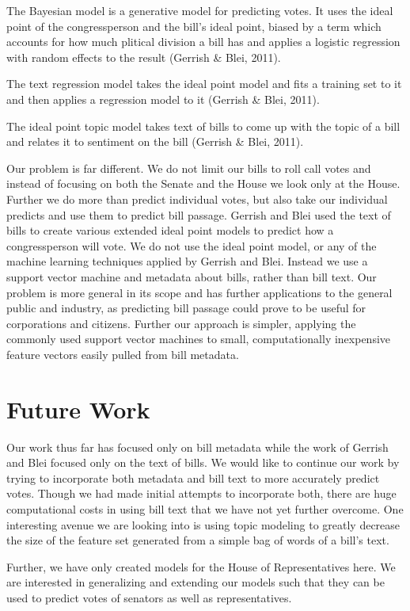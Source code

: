 \documentclass[11pt,letterpaper,twocolumn]{article}
\begin{document}
The Bayesian model is a generative model for predicting votes. It uses the ideal point of the congressperson and the bill's ideal point, biased by a term which accounts for how much plitical division a bill has and applies a logistic regression with random effects to the result (Gerrish \& Blei, 2011). 

The text regression model takes the ideal point model and fits a training set to it and then applies a regression model to it (Gerrish \& Blei, 2011).

The ideal point topic model takes text of bills to come up with the topic of a bill and relates it to sentiment on the bill (Gerrish \& Blei, 2011).

Our problem is far different. We do not limit our bills to roll call votes and instead of focusing on both the Senate and the House we look only at the House. Further we do more than predict individual votes, but also take our individual predicts and use them to predict bill passage. Gerrish and Blei used the text of bills to create various extended ideal point models to predict how a congressperson will vote. We do not use the ideal point model, or any of the machine learning techniques applied by Gerrish and Blei. Instead we use a support vector machine and metadata about bills, rather than bill text. Our problem is more general in its scope and has further applications to the general public and industry, as predicting bill passage could prove to be useful for  corporations and citizens. Further our approach is simpler, applying the commonly used support vector machines to small, computationally inexpensive feature vectors easily pulled from bill metadata.
 
\section{Future Work}

Our work thus far has focused only on bill metadata while the work of Gerrish and Blei focused only on the text of bills. We would like to continue our work by trying to incorporate both metadata and bill text to more accurately predict votes. Though we had made initial attempts to incorporate both, there are huge computational costs in using bill text that we have not yet further overcome. One interesting avenue we are looking into is using topic modeling to greatly decrease the size of the feature set generated from a simple bag of words of a bill's text.

Further, we have only created models for the House of Representatives here. We are interested in generalizing and extending our models such that they can be used to predict votes of senators as well as representatives. 
\end{document}
